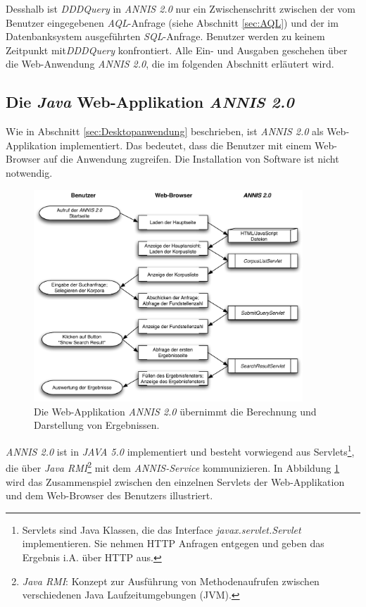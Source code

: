 Desshalb ist \emph{DDDQuery} in \emph{ANNIS 2.0} nur ein Zwischenschritt zwischen der vom Benutzer eingegebenen \emph{AQL}-Anfrage (siehe Abschnitt \ref{sec:AQL}) und der im Datenbanksystem ausgeführten \emph{SQL}-Anfrage. Benutzer werden zu keinem Zeitpunkt mit\emph{DDDQuery} konfrontiert. Alle Ein- und Ausgaben geschehen über die Web-Anwendung \emph{ANNIS 2.0}, die im folgenden Abschnitt erläutert wird.

\subsection{Die \emph{Java} Web-Applikation \emph{ANNIS 2.0}}\label{sec:Web-Applikation}

Wie in Abschnitt \ref{sec:Desktopanwendung} beschrieben, ist \emph{ANNIS 2.0} als Web-Applikation implementiert. Das bedeutet, dass die Benutzer mit einem Web-Browser auf die Anwendung zugreifen. Die Installation von Software ist nicht notwendig.

\begin{figure}[H]
	\centering
	\includegraphics*[width=0.9\textwidth]{figures/DA/WebApplication}
	\caption{Die Web-Applikation \emph{ANNIS 2.0} übernimmt die Berechnung und Darstellung von Ergebnissen.}\label{fig:WebApplication}
\end{figure}

\newpage
\emph{ANNIS 2.0} ist in \emph{JAVA 5.0} implementiert und besteht vorwiegend aus Servlets\footnote{Servlets sind Java Klassen, die das Interface \emph{javax.servlet.Servlet} implementieren. Sie nehmen HTTP Anfragen entgegen und geben das Ergebnis i.A. über HTTP aus.}, die über \emph{Java RMI}\footnote{\emph{Java RMI}: Konzept zur Ausführung von Methodenaufrufen zwischen verschiedenen Java Laufzeitumgebungen (JVM).} mit dem \emph{ANNIS-Service} kommunizieren.
In Abbildung \ref{fig:WebApplication} wird das Zusammenspiel zwischen den einzelnen Servlets der Web-Applikation und dem Web-Browser des Benutzers illustriert. 

